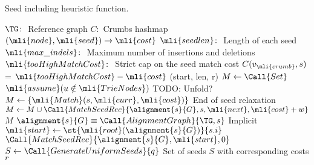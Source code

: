 \begin{algorithm}[t]
	\caption{Seed including heuristic function.}\label{SEEDalg:precompute}
	\begin{algorithmic}[1]
		\State $\TG\colon$ Reference graph \label{SEEDlin:reference}
		\State $C\colon$ Crumbs hashmap $(\mli{node}, \mli{seed}) \to \mli{cost}$
        \State $\mli{seedlen}\colon$ Length of each seed
		\State $\mli{max\_indels}\colon$ Maximum number of insertions and deletions
		\State $\mli{tooHighMatchCost}\colon$ Strict cap on the seed match cost
		\Statex
            \State $C(v_\mli{crumb},s)$ = $\mli{tooHighMatchCost} - \mli{cost}$
		\EndFunction
		\Statex
            \State {}
			\Comment (start, len, r)
		\EndFunction
		\Statex
			\State $M \gets \Call{Set}$
				\State $\mli{assume}(u \notin \mli{TrieNodes})$
				\Comment TODO: Unfold?
				\State $M \gets \{ \mli{Match}(s, \mli{curr}, \mli{cost})\}$
				\Comment End of seed relaxation
			\Else
						\State $M \gets M \cup \Call{MatchSeedRec}{\alignment{s}{G}, s, \mli{next}, \mli{cost} + w}$
					\EndIf
				\EndFor
			\EndIf
			\State \Return $M$
		\EndFunction
		\Statex
			\State $\alignment{s}{G} \equiv \Call{AlignmentGraph}{\TG, s}$
			\Comment Implicit
			\State $\mli{start} \gets \st{\mli{root}(\alignment{s}{G})}{s.i}$
			\State \Return $\Call{MatchSeedRec}{\alignment{s}{G}, \mli{start}, 0}$
		\EndFunction
		\Statex
		 \label{SEEDlin:process_seeds}
			\State $S \gets \Call{GenerateUniformSeeds}{q}$
			\Comment Set of seeds $S$ with corresponding costs $r$


\end{algorithmic}
\end{algorithm}
